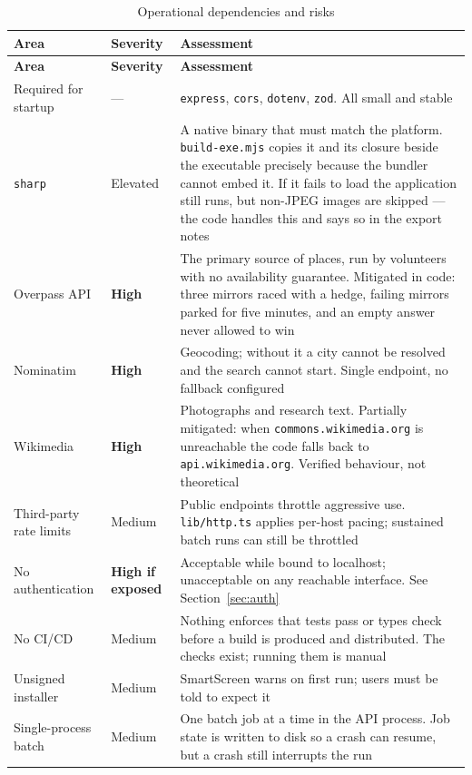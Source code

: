 \documentclass[11pt,a4paper]{report}
\newcommand{\code}[1]{\texttt{\small #1}}
\DeclareRobustCommand{\file}[1]{{\small\nolinkurl{#1}}}
\begin{document}
\begin{longtable}{@{}>{\raggedright\arraybackslash}p{3.2cm}>{\raggedright\arraybackslash}p{2.6cm}>{\raggedright\arraybackslash}p{8.9cm}@{}}
\caption{Operational dependencies and risks}\label{tab:risk}\\
\toprule
\textbf{Area} & \textbf{Severity} & \textbf{Assessment}\\
\midrule
\endfirsthead
\toprule
\textbf{Area} & \textbf{Severity} & \textbf{Assessment}\\
\midrule
\endhead
\bottomrule
\endfoot
Required for startup & --- & \code{express}, \code{cors}, \code{dotenv}, \code{zod}. All small and stable\\
\code{sharp} & Elevated & A native binary that must match the platform. \file{build-exe.mjs} copies it and its closure beside the executable precisely because the bundler cannot embed it. If it fails to load the application still runs, but non-JPEG images are skipped --- the code handles this and says so in the export notes\\
Overpass API & \textbf{High} & The primary source of places, run by volunteers with no availability guarantee. Mitigated in code: three mirrors raced with a hedge, failing mirrors parked for five minutes, and an empty answer never allowed to win\\
Nominatim & \textbf{High} & Geocoding; without it a city cannot be resolved and the search cannot start. Single endpoint, no fallback configured\\
Wikimedia & \textbf{High} & Photographs and research text. Partially mitigated: when \code{commons.wikimedia.org} is unreachable the code falls back to \code{api.wikimedia.org}. Verified behaviour, not theoretical\\
Third-party rate limits & Medium & Public endpoints throttle aggressive use. \file{lib/http.ts} applies per-host pacing; sustained batch runs can still be throttled\\
No authentication & \textbf{High if exposed} & Acceptable while bound to localhost; unacceptable on any reachable interface. See Section~\ref{sec:auth}\\
No CI/CD & Medium & Nothing enforces that tests pass or types check before a build is produced and distributed. The checks exist; running them is manual\\
Unsigned installer & Medium & SmartScreen warns on first run; users must be told to expect it\\
Single-process batch & Medium & One batch job at a time in the API process. Job state is written to disk so a crash can resume, but a crash still interrupts the run\\

\end{longtable}
\end{document}
